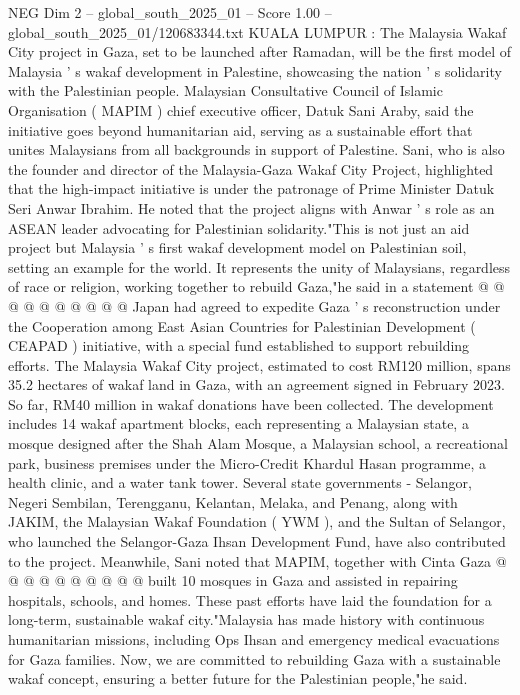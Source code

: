 \begin{textsample}{NEG Dim 2 – global\_south\_2025\_01 – Score 1.00 – global\_south\_2025\_01/120683344.txt}  \label{ex:f2_neg_118}
KUALA LUMPUR : The Malaysia Wakaf City project in Gaza, set to be launched after Ramadan, will be the first model of Malaysia ' s wakaf development in Palestine, showcasing the nation ' s solidarity with the Palestinian people.
Malaysian Consultative Council of Islamic Organisation ( MAPIM ) chief executive officer, Datuk Sani Araby, said the initiative goes beyond humanitarian aid, serving as a sustainable effort that unites Malaysians from all backgrounds in support of Palestine.
Sani, who is also the founder and director of the Malaysia-Gaza Wakaf City Project, highlighted that the high-impact initiative is under the patronage of Prime Minister Datuk Seri Anwar Ibrahim.
He noted that the project aligns with Anwar ' s role as an ASEAN leader advocating for Palestinian solidarity."This is not just an aid project but Malaysia ' s first wakaf development model on Palestinian soil, setting an example for the world.
It represents the unity of Malaysians, regardless of race or religion, working together to rebuild Gaza,"he said in a statement @ @ @ @ @ @ @ @ @ @ Japan had agreed to expedite Gaza ' s reconstruction under the Cooperation among East Asian Countries for Palestinian Development ( CEAPAD ) initiative, with a special fund established to support rebuilding efforts.
The Malaysia Wakaf City project, estimated to cost RM120 million, spans 35.2 hectares of wakaf land in Gaza, with an agreement signed in February 2023.
So far, RM40 million in wakaf donations have been collected.
The development includes 14 wakaf apartment blocks, each representing a Malaysian state, a mosque designed after the Shah Alam Mosque, a Malaysian school, a recreational park, business premises under the Micro-Credit Khardul Hasan programme, a health clinic, and a water tank tower.
Several state governments - Selangor, Negeri Sembilan, Terengganu, Kelantan, Melaka, and Penang, along with JAKIM, the Malaysian Wakaf Foundation ( YWM ), and the Sultan of Selangor, who launched the Selangor-Gaza Ihsan Development Fund, have also contributed to the project.
Meanwhile, Sani noted that MAPIM, together with Cinta Gaza @ @ @ @ @ @ @ @ @ @ built 10 mosques in Gaza and assisted in repairing hospitals, schools, and homes.
These past efforts have laid the foundation for a long-term, sustainable wakaf city."Malaysia has made history with continuous humanitarian missions, including Ops Ihsan and emergency medical evacuations for Gaza families.
Now, we are committed to rebuilding Gaza with a sustainable wakaf concept, ensuring a better future for the Palestinian people,"he said.

\end{textsample}
